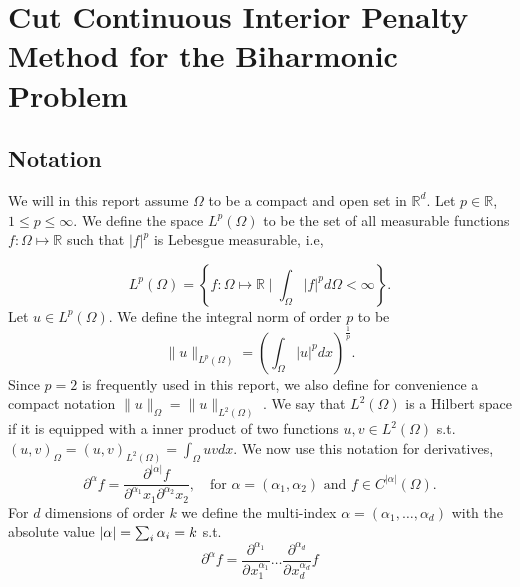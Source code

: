 
\section{Cut Continuous Interior Penalty Method for the Biharmonic Problem}%
\label{sec:cutcip_biharmonic_problem}

\subsection{Notation}%
\label{sub:notation}

We will in this report assume $\Omega $ to be a compact and open set in $\mathbb{R} ^{d}$. Let $p \in \mathbb{R} $, $ 1 \le  p \le  \infty$. We define the space $L^{p}\left( \Omega  \right) $ to be the set of all measurable functions $f: \Omega  \mapsto \mathbb{R} $ such that
$\left\lvert f \right\rvert ^{p}$ is Lebesgue measurable, i.e,

\begin{equation*}
    L^{p}\left( \Omega  \right) = \left\{ f: \Omega \mapsto \mathbb{R}  \mid \int_{\Omega }^{} \left\lvert f \right\rvert ^{p} d \Omega  < \infty  \right\}
.\end{equation*}
Let $u \in L^{p}\left( \Omega  \right) $. We define the integral norm of order $p$ to be \[
\| u \|_{ L^{p}\left( \Omega  \right)  }^{  }  = \left( \int_{\Omega }^{} \left\lvert u \right\rvert ^{p} dx  \right) ^{\frac{1}{p}}.
\]
Since $p=2$ is frequently used in this report, we also define for convenience a compact notation $\| u \|_{ \Omega  }^{  }  = \| u \|_{ L^{2}\left( \Omega  \right)  }^{  } $ .  We say that $L^{2}\left( \Omega  \right) $ is a Hilbert space if it is equipped with a inner
product of two functions $u,v \in L^{2}\left( \Omega  \right) $ s.t.
    $
\left( u,v \right) _{\Omega } = \left( u,v \right) _{L^2\left( \Omega  \right) } = \int_{\Omega }^{} u  v dx.
$
We now use this notation for derivatives,
\begin{equation}
\label{eq:mixed_derivative}
\partial ^{\alpha  } f = \frac{\partial ^{\left\lvert \alpha  \right\rvert } f}{ \partial ^{\alpha _{1} } x_{1} \partial ^{\alpha _{2}} x_{2}  }, \quad \text{for } \alpha=\left( \alpha _{1}, \alpha _{2} \right) \text{ and } f \in C^{\left\lvert \alpha  \right\rvert }
\left( \Omega  \right)
.\end{equation}
For $d$ dimensions of order $k$ we define the multi-index $\alpha  = ( \alpha _{1}, \ldots, \alpha _{d})  $ with the absolute value $\left\lvert  \alpha   \right\rvert = \sum_{i}^{}  \alpha _{i} = k $ s.t.
\[
\partial ^{\alpha} f = \frac{\partial ^{ \alpha_{1}  }  } {\partial^{} x_{1}^{\alpha _{1}}  } \ldots \frac{\partial ^{ \alpha_{d}  }  } {\partial^{} x_{d}^{\alpha _{d}}  } f
\]


